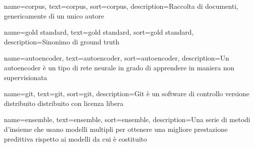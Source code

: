 








{
    name=corpus,
    text=corpus,
    sort=corpus,
    description={Raccolta di documenti, genericamente di un unico autore}
}

{
    name=gold standard,
    text=gold standard,
    sort=gold standard,
    description={Sinonimo di ground truth}
}

{
    name=autoencoder,
    text=autoencoder,
    sort=autoencoder,
    description={Un autoencoder è un tipo di rete neurale in grado di apprendere in maniera non supervisionata}
}


{
    name=git,
    text=git,
    sort=git,
    description={Git è un software di controllo versione distribuito distribuito con licenza libera}
}


{
    name=ensemble,
    text=ensemble,
    sort=ensemble,
    description={Una serie di metodi d'insieme che usano modelli multipli per ottenere una migliore prestazione predittiva rispetto ai modelli da cui è costituito}
}

